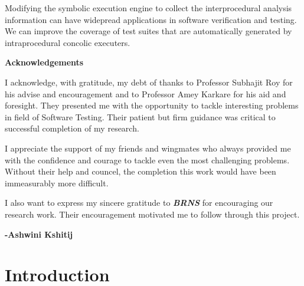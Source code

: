 \documentclass[12pt,oneside]{book}
\begin{document}
\vspace {0.5 cm}

Modifying the symbolic execution engine to collect the interprocedural analysis information can have widepread applications in software verification and testing. We can improve the coverage of test suites that are automatically generated by intraprocedural concolic executers.   




\newpage

\begin{center}
\textbf{\Large{Acknowledgements}}
\end{center}

\vspace{1.0 cm}

I acknowledge, with gratitude, my debt of thanks to Professor Subhajit Roy for his advise and encouragement and to Professor Amey Karkare for his aid and foresight. They presented me with the opportunity to tackle interesting problems in field of Software Testing. Their patient but firm guidance was critical to successful completion of my research.  

\vspace{0.5 cm}

I appreciate the support of my friends and wingmates who always provided me with the confidence and courage to tackle even the most challenging problems. Without their help and councel, the completion this work would have been immeasurably more difficult. 

\vspace{1.0 cm}

I also want to express my sincere gratitude to \textit {\textbf {BRNS}} for encouraging our research work. Their encouragement motivated me to follow through this project.

\begin{flushright}
\textbf{-Ashwini Kshitij}
\end{flushright}

\newpage


\tableofcontents
\listoffigures
\listoftables


\mainmatter


\chapter{Introduction}
\end{document}

